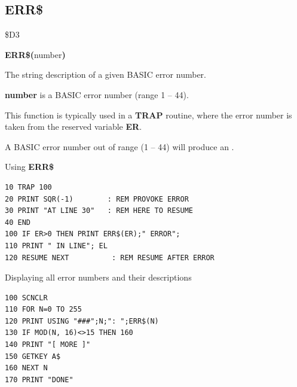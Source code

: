\subsection{ERR\$}
\begin{description}[leftmargin=2cm,style=nextline]
\item [Token:]    \$D3

\item [Format:]   {\bf ERR\$(}number{\bf)}

\item [Returns:]  The string description of a given BASIC error number.

                  {\bf number} is a BASIC error number (range  1 -- 44).

                  This function is typically used in a {\bf TRAP} routine, where the error number is taken from the reserved variable {\bf ER}.

\item [Remarks:]  A BASIC error number out of range (1 -- 44) will produce an .

\item [Examples:] Using {\bf ERR\$}

\begin{tcolorbox}[colback=black,coltext=white]
\verbatimfont{\codefont}
\begin{verbatim}
10 TRAP 100
20 PRINT SQR(-1)        : REM PROVOKE ERROR
30 PRINT "AT LINE 30"   : REM HERE TO RESUME
40 END
100 IF ER>0 THEN PRINT ERR$(ER);" ERROR";
110 PRINT " IN LINE"; EL
120 RESUME NEXT          : REM RESUME AFTER ERROR
\end{verbatim}
\end{tcolorbox}

                  Displaying all error numbers and their descriptions

\begin{tcolorbox}[colback=black,coltext=white]
\verbatimfont{\codefont}
\begin{verbatim}
100 SCNCLR
110 FOR N=0 TO 255
120 PRINT USING "###";N;": ";ERR$(N)
130 IF MOD(N, 16)<>15 THEN 160
140 PRINT "[ MORE ]"
150 GETKEY A$
160 NEXT N
170 PRINT "DONE"
\end{verbatim}
\end{tcolorbox}
\end{description}


\newpage
